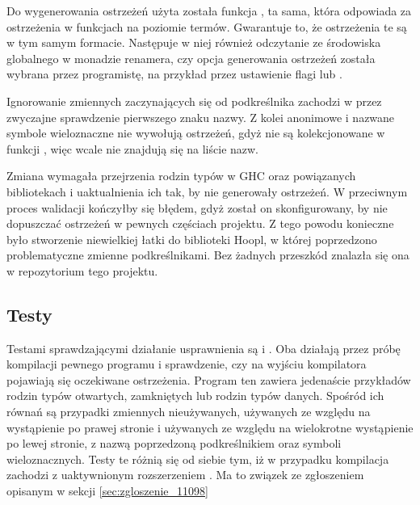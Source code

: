 Do wygenerowania ostrzeżeń użyta została funkcja , ta
sama, która odpowiada za ostrzeżenia w funkcjach na poziomie termów. Gwarantuje
to, że ostrzeżenia te są w tym samym formacie. Następuje w niej również
odczytanie ze środowiska globalnego w monadzie renamera, czy opcja generowania
ostrzeżeń została wybrana przez programistę, na przykład przez ustawienie flagi
 lub .

Ignorowanie zmiennych zaczynających się od podkreślnika zachodzi w
 przez zwyczajne sprawdzenie pierwszego znaku nazwy.
Z kolei anonimowe i nazwane symbole wieloznaczne nie wywołują ostrzeżeń, gdyż nie
są kolekcjonowane w funkcji , więc wcale nie
znajdują się na liście nazw.

Zmiana wymagała przejrzenia rodzin typów w GHC oraz powiązanych bibliotekach i
uaktualnienia ich tak, by nie generowały ostrzeżeń. W przeciwnym  proces
walidacji kończyłby się błędem, gdyż został on skonfigurowany, by nie dopuszczać
ostrzeżeń w pewnych częściach projektu. Z tego powodu konieczne było stworzenie
niewielkiej łatki do biblioteki Hoopl, w której poprzedzono problematyczne
zmienne podkreślnikami. Bez żadnych przeszkód znalazła się ona w repozytorium
tego projektu.

\subsection{Testy} %

Testami sprawdzającymi działanie usprawnienia są  i
. Oba działają przez próbę kompilacji pewnego
programu i sprawdzenie, czy na wyjściu kompilatora pojawiają się oczekiwane
ostrzeżenia. Program ten zawiera jedenaście przykładów rodzin typów otwartych,
zamkniętych lub rodzin typów danych. Spośród ich równań są przypadki zmiennych
nieużywanych, używanych ze względu na wystąpienie po prawej stronie i używanych
ze względu na wielokrotne wystąpienie po lewej stronie, z nazwą poprzedzoną
podkreślnikiem oraz symboli wieloznacznych. Testy te różnią się od siebie tym,
iż w przypadku  kompilacja zachodzi z
uaktywnionym rozszerzeniem . Ma to związek ze zgłoszeniem
opisanym w sekcji \ref{sec:zgloszenie_11098}

